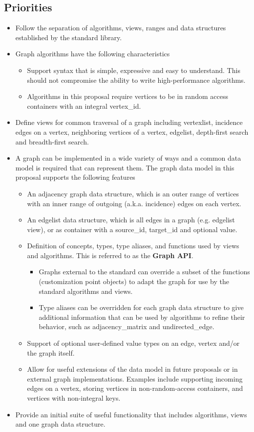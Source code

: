 \documentclass[10pt,onecolumn]{article}
\begin{document}
\subsection{Priorities}
\begin{itemize}
\item Follow the separation of algorithms, views, ranges and data structures established by the standard library.
\item Graph algorithms have the following characteristics
\begin{itemize}
\item Support syntax that is simple, expressive and easy to understand. This should not compromise the ability to write high-performance algorithms.
\item Algorithms in this proposal require vertices to be in random access containers with an integral vertex\_id.
\end{itemize}
\item Define views for common traversal of a graph including vertexlist, incidence edges on a vertex, neighboring vertices of a vertex, edgelist, depth-first search and breadth-first search.
\item A graph can be implemented in a wide variety of ways and a common data model is required that can represent them. The graph data model in this proposal supports the following features
\begin{itemize}
\item An adjacency graph data structure, which is an outer range of vertices with an inner range of outgoing (a.k.a. incidence) edges on each vertex. 
\item An edgelist data structure, which is all edges in a graph (e.g. edgelist view), or as container with a source\_id, target\_id and optional value.
\item Definition of concepts, types, type aliases, and functions used by views and algorithms. This is referred to as the \textbf{Graph API}.
\begin{itemize}
\item Graphs external to the standard can override a subset of the functions (customization point objects) to adapt the graph for use by the standard algorithms and views.
\item Type aliases can be overridden for each graph data structure to give additional information that can be used by algorithms to refine their behavior, such as adjacency\_matrix and undirected\_edge.
\end{itemize}
\item Support of optional user-defined value types on an edge, vertex and/or the graph itself.
\item Allow for useful extensions of the data model in future proposals or in external graph implementations. Examples include supporting incoming edges on a vertex, storing vertices in non-random-access containers, and vertices with non-integral keys.
\end{itemize}
\item Provide an initial suite of useful functionality that includes algorithms, views and one graph data structure.
\end{itemize}
\end{document}
